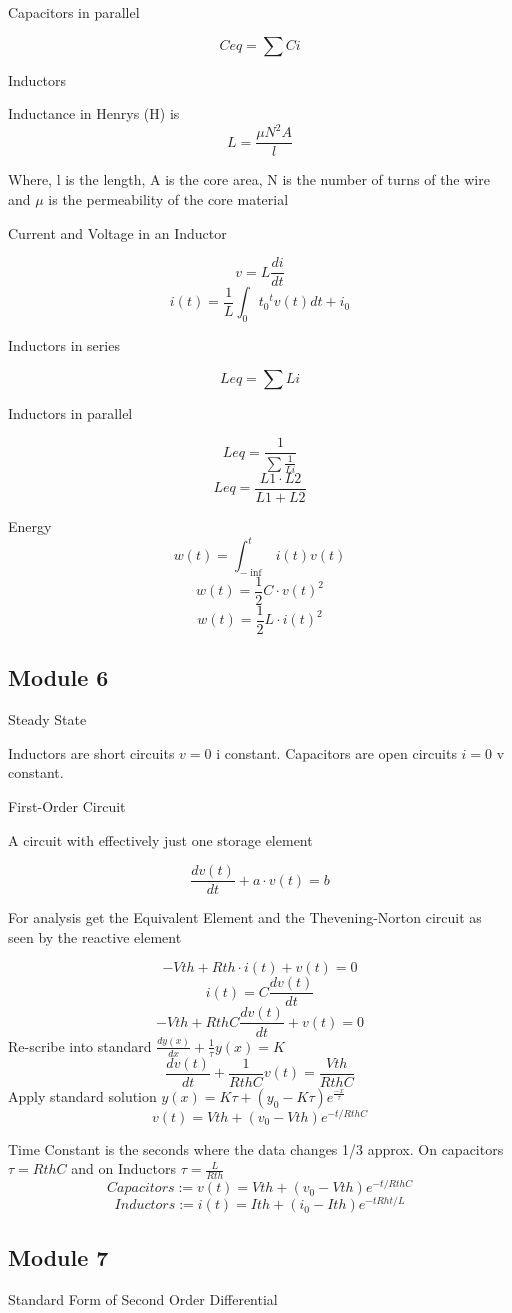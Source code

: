 \documentclass[]{article}
\begin{document}
Capacitors in parallel

$$Ceq=\sum Ci$$

Inductors

Inductance in Henrys (H) is 
$$L=\frac{\mu N^2 A}{l}$$

Where, l is the length, A is the core area, N is the number of turns of the wire and $\mu$ is the permeability of the core
material

Current and Voltage in an Inductor

$$v=L\frac{di}{dt}$$
$$i(t)=\frac{1}{L}\int_0{t_0}^{t}{v(t)dt}+i_0$$	

Inductors in series

$$Leq=\sum Li$$

Inductors in parallel

$$Leq=\frac{1}{\sum\frac{1}{Li}}$$
$$Leq=\frac{L1\cdot L2}{L1+L2}$$

Energy
$$w(t)=\int_{-\inf}^{t}i(t)v(t)$$
$$w(t)=\frac{1}{2}C\cdot v(t)^2$$
$$w(t)=\frac{1}{2}L\cdot i(t)^2$$

\subsection{Module 6}
Steady State

Inductors are short circuits $v=0$ i constant. Capacitors are open circuits $i=0$ v constant.

First-Order Circuit

A circuit with effectively just one
storage element

$$\frac{dv(t)}{dt}+a\cdot v(t) =b$$

For analysis get the Equivalent Element and the Thevening-Norton circuit as seen by the reactive element

$$-Vth + Rth \cdot i(t) + v(t) =0$$
$$i(t)=C\frac{dv(t)}{dt}$$
$$-Vth +RthC\frac{dv(t)}{dt}+v(t)=0$$
Re-scribe into standard  $\frac{dy(x)}{dx} +\frac{1}{\tau}y(x)=K$
$$\frac{dv(t)}{dt}+\frac{1}{RthC}v(t)=\frac{Vth}{RthC}$$
Apply standard solution $y(x)=K\tau +\left(y_0 -K\tau\right)e^{\frac{-x}{\tau}}$
$$v(t)=Vth+\left(v_0-Vth\right)e^{-t/RthC}$$

Time Constant is the seconds where the data changes 1/3 approx. On capacitors $\tau=RthC$ and on Inductors $\tau=\frac{L}{Rth}$
$$Capacitors:=v(t)=Vth+\left(v_0-Vth\right)e^{-t/RthC}$$
$$Inductors:=i(t)=Ith+\left(i_0-Ith\right)e^{-tRht/L}$$

\subsection{Module 7}
Standard Form of Second Order Differential
\end{document}
